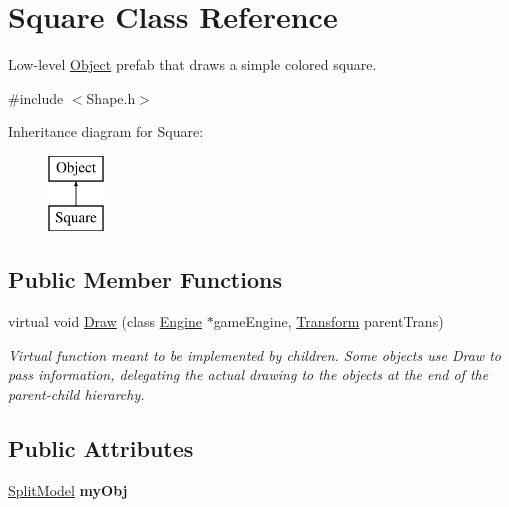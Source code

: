 \hypertarget{class_square}{}\section{Square Class Reference}
\label{class_square}


Low-\/level \hyperlink{class_object}{Object} prefab that draws a simple colored square.  




{\ttfamily \#include $<$Shape.\+h$>$}

Inheritance diagram for Square\+:\begin{figure}[H]
\begin{center}
\leavevmode
\includegraphics[height=2.000000cm]{class_square}
\end{center}
\end{figure}
\subsection*{Public Member Functions}
\begin{DoxyCompactItemize}
\item 
virtual void \hyperlink{class_square_a9a533e0dd001a0b883bea5145c7444e0}{Draw} (class \hyperlink{class_engine}{Engine} $\ast$game\+Engine, \hyperlink{class_transform}{Transform} parent\+Trans)
\begin{DoxyCompactList}\small\item\em Virtual function meant to be implemented by children. Some objects use Draw to pass information, delegating the actual drawing to the objects at the end of the parent-\/child hierarchy. \end{DoxyCompactList}\end{DoxyCompactItemize}
\subsection*{Public Attributes}
\begin{DoxyCompactItemize}
\item 
\hypertarget{class_square_a45f110963e3c27deb64497779f44e7ec}{}\label{class_square_a45f110963e3c27deb64497779f44e7ec} 
\hyperlink{class_split_model}{Split\+Model} {\bfseries my\+Obj}
\end{DoxyCompactItemize}



